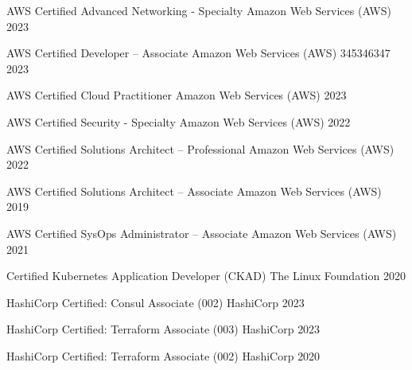 

\begin{cvhonors}

  \cvhonor
    {AWS Certified Advanced Networking - Specialty} %
    {Amazon Web Services (AWS)} %
    {} %
    {2023} %

  \cvhonor
    {AWS Certified Developer – Associate} %
    {Amazon Web Services (AWS)} %
    {345346347} %
    {2023} %

  \cvhonor
    {AWS Certified Cloud Practitioner} %
    {Amazon Web Services (AWS)} %
    {} %
    {2023} %

  \cvhonor
    {AWS Certified Security - Specialty} %
    {Amazon Web Services (AWS)} %
    {} %
    {2022} %

  \cvhonor
    {AWS Certified Solutions Architect – Professional} %
    {Amazon Web Services (AWS)} %
    {} %
    {2022} %

  \cvhonor
    {AWS Certified Solutions Architect – Associate} %
    {Amazon Web Services (AWS)} %
    {} %
    {2019} %

  \cvhonor
    {AWS Certified SysOps Administrator – Associate} %
    {Amazon Web Services (AWS)} %
    {} %
    {2021} %

  \cvhonor
    {Certified Kubernetes Application Developer (CKAD)} %
    {The Linux Foundation} %
    {} %
    {2020} %

  \cvhonor
    {HashiCorp Certified: Consul Associate (002)} %
    {HashiCorp} %
    {} %
    {2023} %

  \cvhonor
    {HashiCorp Certified: Terraform Associate (003)} %
    {HashiCorp} %
    {} %
    {2023} %

  \cvhonor
    {HashiCorp Certified: Terraform Associate (002)} %
    {HashiCorp} %
    {} %
    {2020} %

\end{cvhonors}
